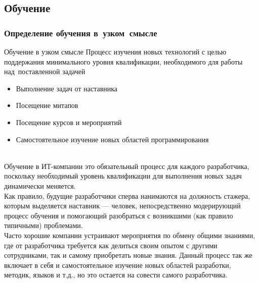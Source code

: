 \documentclass[lecturenotes]{../industrial-development}
\begin{document}
\subsection{Обучение}
\begin{frame} \frametitle{Определение обучения в~узком~смысле}
	\begin{block}{Обучение в узком смысле}
	 Процесс изучения новых технологий с целью поддержания минимального уровня квалификации, необходимого для работы над~поставленной задачей
	\end{block}{}
	\vspace{\baselineskip}
	\begin{itemize}
		\item Выполнение задач от наставника
		\item Посещение митапов
		\item Посещение курсов и мероприятий 
		\item Самостоятельное изучение новых областей программирования
	\end{itemize}
	
\end{frame}
\lecturenotes
\\Обучение в ИТ-компании это обязательный процесс для каждого разработчика, поскольку необходимый уровень квалификации для выполнения новых задач динамически меняется.\\
Как правило, будущие разработчики сперва нанимаются на должность стажера, которым выделяется наставник --- человек, непосредственно модерирующий процесс обучения и помогающий разобраться с возникшими (как правило типичными) проблемами.\\
Часто хорошие компании устраивают мероприятия по обмену общими знаниями, где от разработчика требуется как делиться своим опытом с другими сотрудниками, так и самому приобретать новые знания. Данный процесс так же включает в себя и самостоятельное изучение новых областей разработки, методик, языков и т.д., но это остается на совести самого разработчика.  
\end{document}
